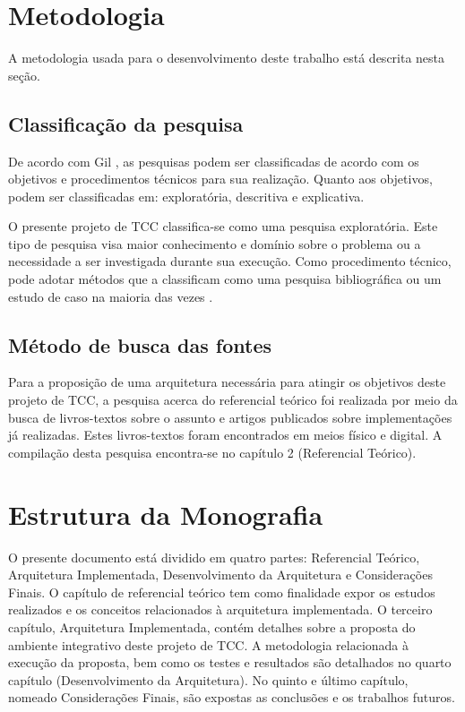 \section{Metodologia}
A metodologia usada para o desenvolvimento deste trabalho está descrita nesta seção. 

\subsection{Classificação da pesquisa}
De acordo com Gil \cite{gil_como_2008}, as pesquisas podem ser classificadas de acordo com os objetivos e procedimentos técnicos para sua realização. Quanto aos objetivos, podem ser classificadas em: exploratória, descritiva e explicativa. 

O presente projeto de TCC classifica-se como uma pesquisa exploratória. Este tipo de pesquisa visa maior conhecimento e domínio sobre o problema ou a necessidade a ser investigada durante sua execução. Como procedimento técnico, pode adotar métodos que a classificam como uma pesquisa bibliográfica ou um estudo de caso na maioria das vezes \cite{gil_como_2008}.

\subsection{Método de busca das fontes}
Para a proposição de uma arquitetura necessária para atingir os objetivos deste projeto de TCC, a pesquisa acerca do referencial teórico foi realizada por meio da busca de livros-textos sobre o assunto e artigos publicados sobre implementações já realizadas. Estes livros-textos foram encontrados em meios físico e digital. A compilação desta pesquisa encontra-se no capítulo 2 (Referencial Teórico).

\section{Estrutura da Monografia}
O presente documento está dividido em quatro partes: Referencial Teórico, Arquitetura Implementada, Desenvolvimento da Arquitetura e Considerações Finais. O capítulo de referencial teórico tem como finalidade expor os estudos realizados e os conceitos relacionados à arquitetura implementada. O terceiro capítulo, Arquitetura Implementada, contém detalhes sobre a proposta do ambiente integrativo deste projeto de TCC. A metodologia relacionada à execução da proposta, bem como os testes e resultados são detalhados no quarto capítulo (Desenvolvimento da Arquitetura). No quinto e último capítulo, nomeado Considerações Finais, são expostas as conclusões e os trabalhos futuros.